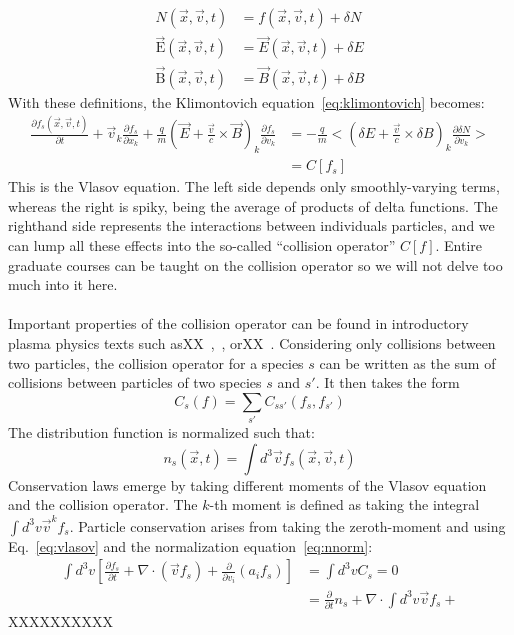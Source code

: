 \begin{align*}
  N(\vec x,\vec v,t)&=f(\vec x,\vec v,t)+\delta N\\
  \mathrm{\vec E}(\vec x,\vec v,t)&=\vec E(\vec x,\vec v,t)+\delta E\\
  \mathrm{\vec B}(\vec x,\vec v,t)&=\vec B(\vec x,\vec v,t)+\delta B
\end{align*}
With these definitions, the Klimontovich equation~\ref{eq:klimontovich} becomes:
\begin{align}
  \frac{\partial f_s(\vec x,\vec v,t)}{\partial t}+\vec v_k\frac{\partial f_s}{\partial x_k}+\frac qm (\vec E+\frac{\vec v}{c}\times\vec B)_k\frac{\partial f_s}{\partial v_k}&=-\frac qm<(\delta E+\frac{\vec v}{c}\times\delta B)_k\frac{\partial \delta N}{\partial v_k}>\nonumber\\
  &=C[f_s] \label{eq:vlasov}
\end{align}
This is the Vlasov equation. The left side depends only smoothly-varying terms, whereas the right is spiky, being the average of products of delta functions. The righthand side represents the interactions between individuals particles, and we can lump all these effects into the so-called ``collision operator'' $C[f]$. Entire graduate courses can be taught on the collision operator so we will not delve too much into it here.\\
\\
Important properties of the collision operator can be found in introductory plasma physics texts such asXX~\cite{Nicholson},~\cite{Hazeltine}, orXX~\cite{KunzLecture1}. Considering only collisions between two particles, the collision operator for a species $s$ can be written as the sum of collisions between particles of two species $s$ and $s'$. It then takes the form
\begin{equation}
  C_s(f)=\sum_{s'}C_{ss'}(f_s,f_{s'})
\end{equation}
The distribution function is normalized such that:
\begin{equation}
  n_s(\vec x,t)=\int d^3\vec v f_s(\vec x,\vec v, t)\label{eq:nnorm}
\end{equation}
Conservation laws emerge by taking different moments of the Vlasov equation and the collision operator. The $k$-th moment is defined as taking the integral $\int d^3v \vec v^k f_s$. Particle conservation arises from taking the zeroth-moment and using Eq.~\ref{eq:vlasov} and the normalization equation~\ref{eq:nnorm}:
\begin{align}
  \int d^3v \left[\frac{\partial f_s}{\partial t}+\nabla\cdot(\vec vf_s)+\frac{\partial}{\partial v_i}(a_i f_s)\right] &=\int d^3v C_s=0\\
  &=\frac{\partial}{\partial t}n_s+\nabla\cdot\int d^3v \vec vf_s+
\end{align}
XXXXXXXXXX

